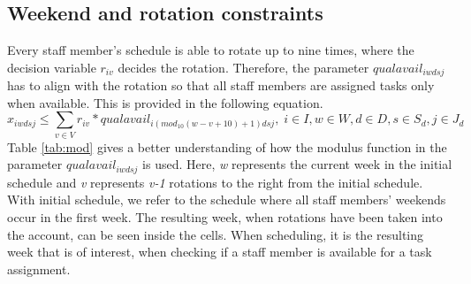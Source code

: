 \subsection{Weekend and rotation constraints} \label{section:weekend_rot_constraints}
Every staff member's schedule is able to rotate up to nine times, where the decision variable $r_{iv}$ decides the rotation. Therefore, the parameter $qualavail_{iwdsj}$ has to align with the rotation so that all staff members are assigned tasks only when available. This is provided in the following equation.
\begin{equation} \label{constr:qualavail}
x_{iwdsj} \leq \sum_{v \in V} r_{iv}*qualavail_{i(mod_{10}(w-v+10)+1)dsj}, \;   i \in I, w \in W, d \in D, s \in S_d, j \in J_d
\end{equation}
Table \ref{tab:mod} gives a better understanding of how the modulus function in the parameter $qualavail_{iwdsj}$ is used. Here, \textit{w} represents the current week in the initial schedule and \textit{v} represents \textit{v-1} rotations to the right from the initial schedule. With initial schedule, we refer to the schedule where all staff members' weekends occur in the first week. The resulting week, when rotations have been taken into the account, can be seen inside the cells. When scheduling, it is the resulting week that is of interest, when checking if a staff member is available for a task assignment. 
